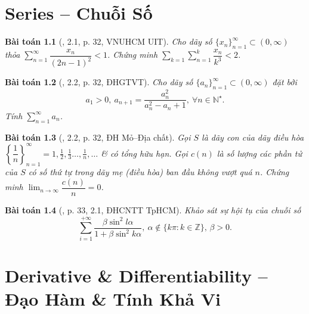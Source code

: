 \documentclass[oneside]{book}
\newtheorem{baitoan}{Bài toán}
\begin{document}

\chapter{Series -- Chuỗi Số}
\minitoc

\begin{baitoan}[\cite{VMS_VMC2023}, 2.1, p. 32, VNUHCM UIT]
	Cho dãy số $\{x_n\}_{n=1}^\infty\subset(0,\infty)$ thỏa $\sum_{n=1}^\infty \dfrac{x_n}{(2n - 1)^2} < 1$. Chứng minh $\sum_{k=1}\sum_{n=1}^k \dfrac{x_n}{k^3} < 2$.
\end{baitoan}

\begin{baitoan}[\cite{VMS_VMC2023}, 2.2, p. 32, ĐHGTVT]
	Cho dãy số $\{a_n\}_{n=1}^\infty\subset(0,\infty)$ đặt bởi
	\begin{equation*}
		a_1 > 0,\ a_{n+1} = \frac{a_n^2}{a_n^2 - a_n + 1},\ \forall n\in\mathbb{N}^\star.
	\end{equation*}
	Tính $\sum_{n=1}^\infty a_n$.
\end{baitoan}

\begin{baitoan}[\cite{VMS_VMC2023}, 2.2, p. 32, ĐH Mỏ--Địa chất]
	Gọi $S$ là dãy con của dãy điều hòa $\left\{\dfrac{1}{n}\right\}_{n=1}^\infty = 1,\frac{1}{2},\frac{1}{3}\ldots,\frac{1}{n},\ldots$ \& có tổng hữu hạn. Gọi $c(n)$ là số lượng các phần tử của $S$ có số thứ tự trong dãy mẹ (điều hòa) ban đầu không vượt quá $n$. Chứng minh $\lim_{n\to\infty} \dfrac{c(n)}{n} = 0$.
\end{baitoan}

\begin{baitoan}[\cite{VMS_VMC2024}, p. 33, 2.1, ĐHCNTT TpHCM]
	Khảo sát sự hội tụ của chuỗi số
	\begin{equation*}
		\sum_{i=1}^{+\infty} \frac{\beta\sin^2l\alpha}{1 + \beta\sin^2k\alpha},\ \alpha\notin\{k\pi:k\in\mathbb{Z}\},\,\beta > 0.
	\end{equation*}
\end{baitoan}


\chapter{Derivative \& Differentiability -- Đạo Hàm \& Tính Khả Vi}
\minitoc

\end{document}
